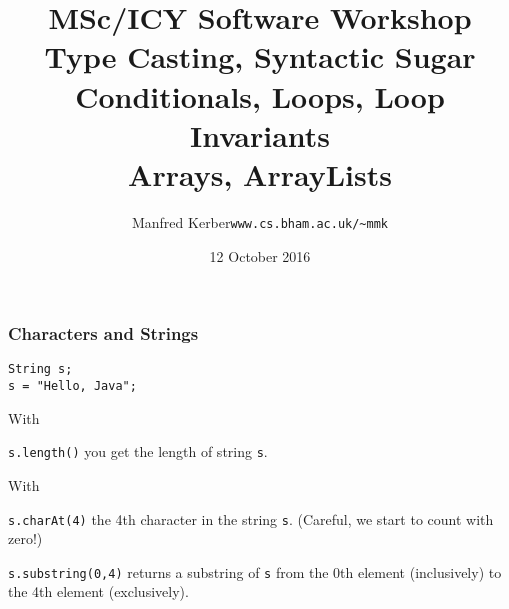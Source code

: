 \documentclass{beamer}
\def\mytoday{12 October 2016}
\def\mcolor#1#2{\rule{0ex}{0ex}\color{#1}#2\color{black}{}}
\begin{document}
\title{MSc/ICY Software Workshop\\
Type Casting, Syntactic Sugar\\
Conditionals, Loops, Loop Invariants\\
Arrays, ArrayLists}


\author[Manfred~Kerber]{\begin{tabular}{ll}
\mcolor{blue}{Manfred Kerber} &   {\tt www.cs.bham.ac.uk/\~{}mmk}\\
\end{tabular}}

\date{\mytoday}

\begin{frame}
\titlepage


\end{frame}


\begin{frame}
\frametitle{Characters and Strings}
\texttt{String s;}\\
\texttt{s = "Hello, Java";}


With \mcolor{blue}{\texttt{s.length()}} you get the length of string \texttt{s}.

With \mcolor{blue}{\texttt{s.charAt(4)}} the 4th character in the string \texttt{s}.
(Careful, we start to count with zero!)

\mcolor{blue}{\texttt{s.substring(0,4)}} returns a substring of \texttt{s} from the 0th
element (inclusively) to the 4th element (exclusively).


\end{frame}

\end{document}
